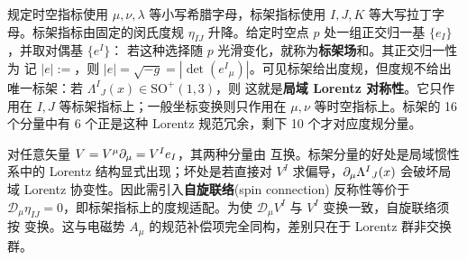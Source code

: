 规定时空指标使用 $\mu,\nu,\lambda$ 等小写希腊字母，标架指标使用 $I,J,K$ 等大写拉丁字母。标架指标由固定的闵氏度规 $\eta_{IJ}$ 升降。给定时空点 $p$ 处一组正交归一基 $\{e_I\}$，并取对偶基 $\{e^I\}$：
若这种选择随 $p$ 光滑变化，就称为\textbf{标架场}和。其正交归一性为
记 $|e|:=$，则 $|e|=\sqrt{-g}=|\det(e^I{}_\mu)|$。可见标架给出度规，但度规不给出唯一标架：若 $\Lambda^I{}_J(x)\in\mathrm{SO}^+(1,3)$，则
这就是\textbf{局域 Lorentz 对称性}。它只作用在 $I,J$ 等标架指标上；一般坐标变换则只作用在 $\mu,\nu$ 等时空指标上。标架的 16 个分量中有 6 个正是这种 Lorentz 规范冗余，剩下 10 个才对应度规分量。

对任意矢量 $V=V^\mu\partial_\mu=V^I e_I$，其两种分量由
互换。标架分量的好处是局域惯性系中的 Lorentz 结构显式出现；坏处是若直接对 $V^I$ 求偏导，$\partial_\mu\Lambda^I{}_J(x)$ 会破坏局域 Lorentz 协变性。因此需引入\textbf{自旋联络}(spin connection)
反称性等价于 $\mathcal D_\mu\eta_{IJ}=0$，即标架指标上的度规适配。为使 $\mathcal D_\mu V^I$ 与 $V^I$ 变换一致，自旋联络须按
变换。这与电磁势 $A_\mu$ 的规范补偿项完全同构，差别只在于 Lorentz 群非交换群。

